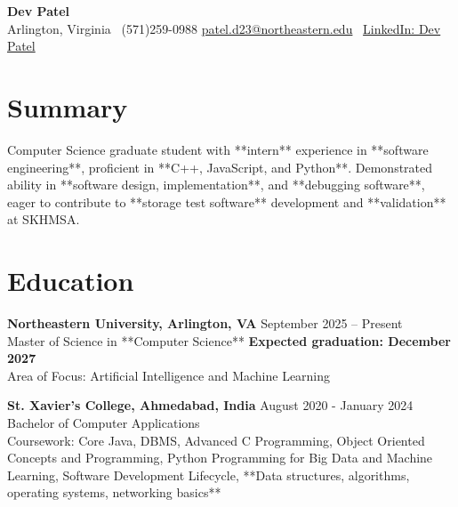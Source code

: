 \documentclass[a4paper,10pt]{article}
\begin{document}
\begin{center}
\vspace{-3mm}
    \fontsize{16}{18}\selectfont \textbf{Dev Patel} \\
    \vspace{0mm}
    \normalsize Arlington, Virginia \textbar\ (571)259-0988  \textbar       \href{mailto:patel.d23@northeastern.edu}{patel.d23@northeastern.edu} \textbar\ \href{https://www.linkedin.com/in/devxpatel//}{LinkedIn: Dev Patel} \\
\end{center}



\section*{Summary}
Computer Science graduate student with **intern** experience in **software engineering**, proficient in **C++, JavaScript, and Python**. Demonstrated ability in **software design, implementation**, and **debugging software**, eager to contribute to **storage test software** development and **validation** at SKHMSA.
 
\vspace{ 0 mm}
\section*{Education}
\textbf{Northeastern University, Arlington, VA} \hfill September 2025 -- Present\\
Master of Science in **Computer Science** \hfill \textbf{Expected graduation: December 2027} \\
Area of Focus: Artificial Intelligence and Machine Learning

\vspace{1 mm} %
\textbf{St. Xavier's College, Ahmedabad, India} \hfill August 2020 - January 2024 \\
Bachelor of Computer Applications\\
Coursework: Core Java, DBMS, Advanced C Programming, Object Oriented Concepts and Programming, Python Programming for Big Data and Machine Learning, Software Development Lifecycle, **Data structures, algorithms, operating systems, networking basics**
\end{document}
